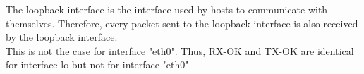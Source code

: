 The loopback interface is the interface used by hosts to communicate with themselves. Therefore, every packet sent to the loopback interface is also received by the loopback interface. \\
This is not the case for interface "eth0". Thus, RX-OK and TX-OK are identical for interface lo but not for interface "eth0".
